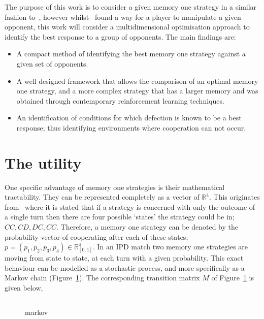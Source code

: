 \documentclass[10pt]{article}
\newcommand{\R}{\mathbb{R}}
\begin{document}
The purpose of this work is to consider a given memory one strategy in a similar
fashion to~\cite{Press2012}, however whilst~\cite{Press2012} found a way for a
player to manipulate a given opponent, this work will consider a
multidimensional optimisation approach to identify the best response to a group
of opponents. The main findings are:

\begin{itemize}
    \item A compact method of identifying the best memory one strategy against a
    given set of opponents.
    \item A well designed framework that allows the comparison of an optimal memory
          one strategy, and a more complex strategy that has a larger memory and
          was obtained through contemporary reinforcement learning techniques.
    \item An identification of conditions for which defection is known to be
          a best response; thus identifying environments where cooperation can
          not occur.
\end{itemize}

\section{The utility}\label{section:utility}

One specific advantage of memory one strategies is their mathematical
tractability. They can be represented completely as a vector of \(\R^{4}\). This
originates from~\cite{Nowak1989} where it is stated that if a strategy is
concerned with only the outcome of a single turn then there are four possible
`states' the strategy could be in; \(CC, CD, DC,CC\). Therefore, a memory one
strategy can be denoted by the probability vector of cooperating after each of
these states; \(p=(p_1, p_2, p_3, p_4) \in \R_{[0,1]} ^ 4\). In an IPD match two
memory one strategies are moving from state to state, at each turn with a given
probability. This exact behaviour can be modelled as a stochastic process, and
more specifically as a Markov chain (Figure~\ref{fig:markov_chain}). The
corresponding transition matrix \(M\) of Figure~\ref{fig:markov_chain} is given
below,

\begin{figure}
    \begin{minipage}{0.35\textwidth}
        
        \caption{markov}
        \label{fig:markov_chain}
    \end{minipage}
    \begin{minipage}{0.45\textwidth}
    \begin{equation*}
        
    \end{equation*}
    \end{minipage}
\end{figure}
\end{document}
